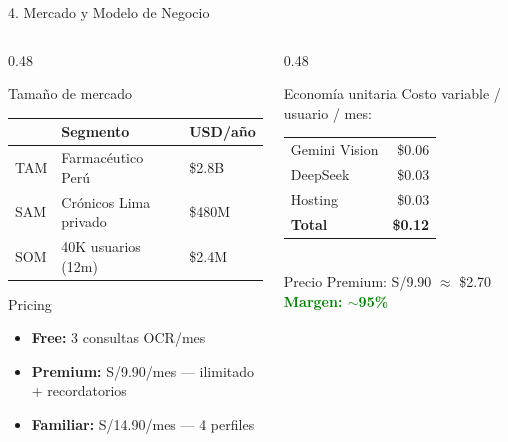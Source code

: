 \documentclass[aspectratio=169,11pt]{beamer}
\begin{document}
\begin{frame}{4. Mercado y Modelo de Negocio}
\begin{columns}[T]
\begin{column}{0.48\textwidth}
\begin{block}{Tama\~no de mercado}
\small
\begin{tabular}{lll}
\toprule
 & \textbf{Segmento} & \textbf{USD/a\~no} \\
\midrule
TAM & Farmac\'eutico Per\'u & \$2.8B \\
SAM & Cr\'onicos Lima privado & \$480M \\
SOM & 40K usuarios (12m) & \$2.4M \\
\bottomrule
\end{tabular}
\end{block}
\bigskip
\begin{block}{Pricing}
\small
\begin{itemize}
  \item \textbf{Free:} 3 consultas OCR/mes
  \item \textbf{Premium:} S/9.90/mes --- ilimitado + recordatorios
  \item \textbf{Familiar:} S/14.90/mes --- 4 perfiles
\end{itemize}
\end{block}
\end{column}
\begin{column}{0.48\textwidth}
\begin{block}{Econom\'ia unitaria}
\small
Costo variable / usuario / mes:\\[0.3em]
\begin{tabular}{lr}
Gemini Vision & \$0.06 \\
DeepSeek & \$0.03 \\
Hosting & \$0.03 \\
\midrule
\textbf{Total} & \textbf{\$0.12} \\
\end{tabular}\\[0.5em]
Precio Premium: S/9.90 $\approx$ \$2.70\\[0.3em]
\textcolor{Green}{\textbf{Margen: $\sim$95\%}}
\end{block}
\end{column}
\end{columns}
\end{frame}
\end{document}
